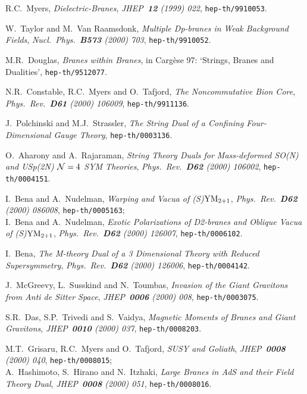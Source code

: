 \documentclass[12pt,a4paper]{article}
\begin{document}
\begin{thebibliography}{99}

R.C.~Myers, {\sl Dielectric-Branes}, {\it JHEP~{\bf 12} (1999) 022}, 
{\tt hep-th/9910053}.

W.~Taylor and M.~Van Raamsdonk, {\sl Multiple Dp-branes in Weak
Background Fields}, {\it Nucl.~Phys.~{\bf B573} (2000) 703},
{\tt hep-th/9910052}.

M.R.~Douglas, {\sl Branes within Branes}, in Carg\`ese 97: `Strings,
Branes and Dualities', {\tt hep-th/9512077}.

N.R.~Constable, R.C.~Myers and O.~Tafjord, {\sl The Noncommutative Bion 
Core}, {\it Phys.~Rev.~{\bf D61} (2000) 106009},
{\tt hep-th/9911136}. 

J.~Polchinski and M.J.~Strassler, {\sl The String Dual of a Confining
Four-Dimensional Gauge Theory}, {\tt hep-th/0003136}.

O.~Aharony and A.~Rajaraman, {\sl String Theory Duals for Mass-deformed
SO(N) and USp(2N) ${\cal N}=4$ SYM Theories}, {\it Phys.~Rev.~{\bf D62}
(2000) 106002}, {\tt hep-th/0004151}. 

I.~Bena and A.~Nudelman, {\sl Warping and Vacua of 
(S)${\rm YM}_{2+1}$}, {\it Phys.~Rev.~{\bf D62} (2000) 086008},
{\tt hep-th/0005163};\\
I.~Bena and A.~Nudelman, {\sl Exotic Polarizations of D2-branes and
Oblique Vacua of (S)${\rm YM}_{2+1}$}, {\it Phys.~Rev.~{\bf D62} (2000)
126007}, {\tt hep-th/0006102}.

I.~Bena, {\sl The M-theory Dual of a 3 Dimensional Theory with
Reduced Supersymmetry}, {\it Phys.~Rev.~{\bf D62} (2000) 126006},
{\tt hep-th/0004142}.

J.~McGreevy, L.~Susskind and N.~Toumbas, {\sl Invasion of the Giant
Gravitons from Anti de Sitter Space}, {\it JHEP~{\bf 0006}
(2000) 008}, {\tt hep-th/0003075}.

S.R.~Das, S.P.~Trivedi and S.~Vaidya, {\sl Magnetic Moments of Branes
and Giant Gravitons}, {\it JHEP~{\bf 0010} (2000) 037},
{\tt hep-th/0008203}.

M.T.~Grisaru, R.C.~Myers and O.~Tafjord, {\sl SUSY and Goliath},
{\it JHEP~{\bf 0008} (2000) 040}, {\tt hep-th/0008015};\\
A.~Hashimoto, S.~Hirano and N.~Itzhaki, {\sl Large Branes in AdS and
their Field Theory Dual}, {\it JHEP~{\bf 0008} (2000) 051},
{\tt hep-th/0008016}.


\end{thebibliography}
\end{document}
